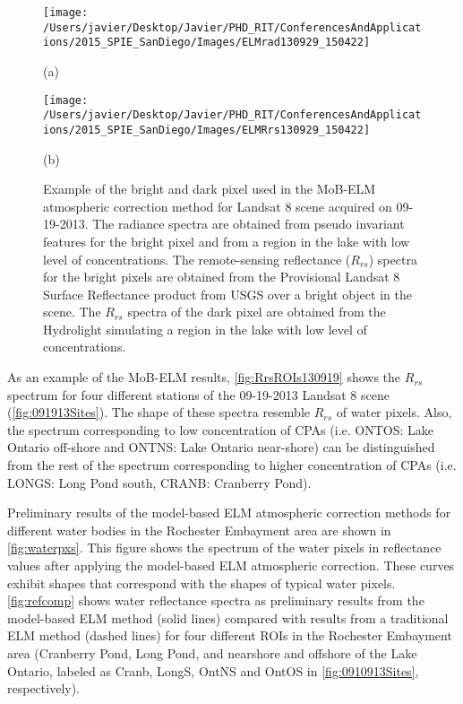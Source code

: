 \begin{figure}[htb]
  \begin{minipage}[c]{0.48\linewidth}
    \centering
      \texttt{[image: /Users/javier/Desktop/Javier/PHD\_RIT/ConferencesAndApplications/2015\_SPIE\_SanDiego/Images/ELMrad130929\_150422]}
    \centerline{(a)}\medskip
  \end{minipage}
  \hfill
  \begin{minipage}[d]{0.48\linewidth}
    \centering
      \texttt{[image: /Users/javier/Desktop/Javier/PHD\_RIT/ConferencesAndApplications/2015\_SPIE\_SanDiego/Images/ELMRrs130929\_150422]}
    \centerline{(b)}\medskip
  \end{minipage}
  \caption{Example of the bright and dark pixel used in the MoB-ELM atmospheric correction method for Landsat 8 scene acquired on 09-19-2013. The radiance spectra are obtained from pseudo invariant features for the bright pixel and from a region in the lake with low level of concentrations. The remote-sensing reflectance ($R_{rs}$) spectra for the bright pixels are obtained from the Provisional Landsat 8 Surface Reflectance product from USGS over a bright object in the scene. The $R_{rs}$ spectra of the dark pixel are obtained from the Hydrolight simulating a region in the lake with low level of concentrations.\label{fig:MOBELMpxls} } 
\end{figure}

As an example of the MoB-ELM results, \autoref{fig:RrsROIs130919} shows the $R_{rs}$ spectrum for four different stations of the 09-19-2013 Landsat 8 scene (\autoref{fig:091913Sites}). The shape of these spectra resemble $R_{rs}$ of water pixels. Also, the spectrum corresponding to low concentration of CPAs (i.e. ONTOS: Lake Ontario off-shore and ONTNS: Lake Ontario near-shore) can be distinguished from the rest of the spectrum corresponding to higher concentration of CPAs (i.e. LONGS: Long Pond south, CRANB: Cranberry Pond).


Preliminary results of the model-based ELM atmospheric correction methods for different water bodies in the Rochester Embayment area are shown in \autoref{fig:waterpxs}. This figure shows the spectrum of the water pixels in reflectance values after applying the model-based ELM atmospheric correction. These curves exhibit shapes that correspond with the shapes of typical water pixels. \autoref{fig:refcomp} shows water reflectance spectra as preliminary results from the model-based ELM method (solid lines) compared with results from a traditional ELM method (dashed lines) for four different ROIs in the Rochester Embayment area (Cranberry Pond, Long Pond, and nearshore and offshore of the Lake Ontario, labeled as Cranb, LongS, OntNS and OntOS in \autoref{fig:0910913Sites}, respectively). 


